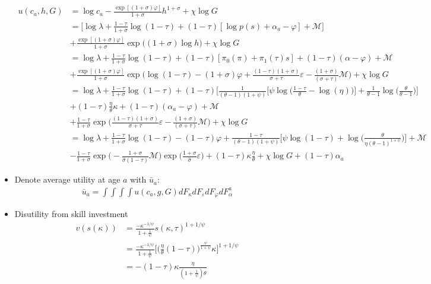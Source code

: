 \documentclass{article}
\newcommand{\M}{\mathcal{M}}
\begin{document}
\begin{itemize}
\begin{align*}
u(c_a, h, G) 
&= 
\log c_a - \frac{\exp[(1+\sigma)\varphi]}{1+\sigma} h^{1+\sigma} + \chi \log G\\
&= \Bigg[ \log \lambda + \frac{1-\tau}{1+\sigma} \log (1-\tau) + (1-\tau)[\log p(s) + \alpha_a - \varphi] + \M \Bigg]\\
&+\frac{\exp[(1+\sigma)\varphi]}{1+\sigma} \exp\Big( (1+\sigma) \log h \Big) + \chi \log G\\
&=  \log \lambda + \frac{1-\tau}{1+\sigma} \log (1-\tau) + (1-\tau)[\pi_0(\pi) + \pi_1(\tau)s] + (1-\tau)(\alpha - \varphi) + \M \\
&+\frac{\exp[(1+\sigma)\varphi]}{1+\sigma} \exp\Big(  \log (1-\tau) - (1+\sigma)\varphi
+ \frac{(1-\tau)(1+\sigma)}{\sigma+\tau} \varepsilon
- \frac{(1+\sigma)}{(\sigma+\tau)} \M \Big) + \chi \log G\\
&=  \log \lambda + \frac{1-\tau}{1+\sigma} \log (1-\tau) + (1-\tau)\Bigg[ \frac{1}{(\theta- 1)(1+\psi)}\Bigg[\psi \log\Bigg(\frac{1-\tau}{\theta} - \log (\eta) \Bigg)\Bigg] + \frac{1}{\theta - 1}\log\Bigg(\frac{\theta}{\theta-1}\Bigg)\Bigg] \\&+ (1-\tau)\frac{\eta}{\theta}\kappa + (1-\tau)(\alpha_a - \varphi) + \M \\
&+\frac{1-\tau}{1+\sigma} \exp\Big( \frac{(1-\tau)(1+\sigma)}{\sigma+\tau} \varepsilon
- \frac{(1+\sigma)}{(\sigma+\tau)} \M \Big) + \chi \log G\\
&=  \log \lambda + \frac{1-\tau}{1+\sigma} \log (1-\tau)   - (1-\tau)\varphi + \frac{1-\tau}{(\theta- 1)(1+\psi)} \Bigg[\psi \log(1-\tau) + \log\Bigg(\frac{\theta}{\eta (\theta - 1)^{1+\psi}}\Bigg)\Bigg] + \M\\
&- \frac{1-\tau}{1+\sigma}\exp\Bigg(-\frac{1+\sigma}{\hat \sigma(1-\tau)} \M \Bigg) \exp\Bigg(\frac{1+\sigma}{\hat\sigma} \varepsilon \Bigg) + (1-\tau) \kappa \frac{\eta}{\theta}+ \chi \log G + (1-\tau)\alpha_a
\end{align*}
\item Denote average utility at age $a$ with $\bar u_a$:
\begin{align*}
\bar u_a = \int \int \int \int u(c_a, g, G) dF_\kappa dF_\varepsilon dF_\varphi dF_\alpha^a
\end{align*}
\item Disutility from skill investment
\begin{align*}
v(s(\kappa)) 
&= \frac{-\kappa^{-1/\psi}}{1+\frac{1}{\psi}} s(\kappa,\tau)^{1+1/\psi}\\
&= \frac{-\kappa^{-1/\psi}}{1+\frac{1}{\psi}}\Bigg[\Big( \frac{\eta}{\theta}(1-\tau)\Big)^{\frac{\psi}{1 + \psi}}\kappa \Bigg]^{1+1/\psi}\\
&= -(1-\tau)\kappa\frac{\eta}{(1+\frac{1}{\psi})\theta}
\end{align*}
\end{itemize}
\end{document}
